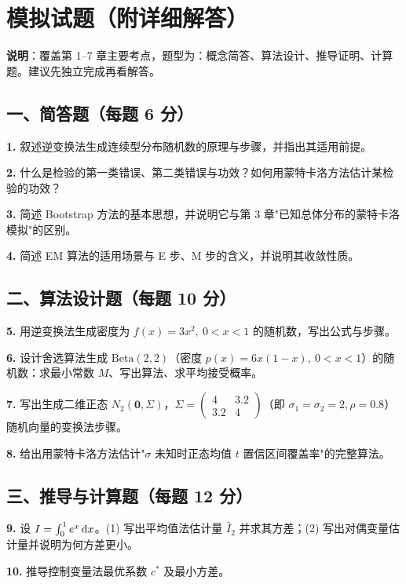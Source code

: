 \section{模拟试题（附详细解答）}

\noindent\textbf{说明}：覆盖第 1--7 章主要考点，题型为：概念简答、算法设计、推导证明、计算题。建议先独立完成再看解答。

\subsection*{一、简答题（每题 6 分）}

\textbf{1.} 叙述逆变换法生成连续型分布随机数的原理与步骤，并指出其适用前提。

\textbf{2.} 什么是检验的第一类错误、第二类错误与功效？如何用蒙特卡洛方法估计某检验的功效？

\textbf{3.} 简述 Bootstrap 方法的基本思想，并说明它与第 3 章"已知总体分布的蒙特卡洛模拟"的区别。

\textbf{4.} 简述 EM 算法的适用场景与 E 步、M 步的含义，并说明其收敛性质。

\subsection*{二、算法设计题（每题 10 分）}

\textbf{5.} 用逆变换法生成密度为 $f(x)=3x^2,\ 0<x<1$ 的随机数，写出公式与步骤。

\textbf{6.} 设计舍选算法生成 $\mathrm{Beta}(2,2)$（密度 $p(x)=6x(1-x),\ 0<x<1$）的随机数：求最小常数 $M$、写出算法、求平均接受概率。

\textbf{7.} 写出生成二维正态 $N_2(\bm 0,\Sigma)$，$\Sigma=\begin{pmatrix}4&3.2\\3.2&4\end{pmatrix}$（即 $\sigma_1=\sigma_2=2,\rho=0.8$）随机向量的变换法步骤。

\textbf{8.} 给出用蒙特卡洛方法估计"$\sigma$ 未知时正态均值 $t$ 置信区间覆盖率"的完整算法。

\subsection*{三、推导与计算题（每题 12 分）}

\textbf{9.} 设 $I=\int_0^1 e^{x}\,\mathrm{d} x$。(1) 写出平均值法估计量 $\hat I_2$ 并求其方差；(2) 写出对偶变量估计量并说明为何方差更小。

\textbf{10.} 推导控制变量法最优系数 $c^*$ 及最小方差。

